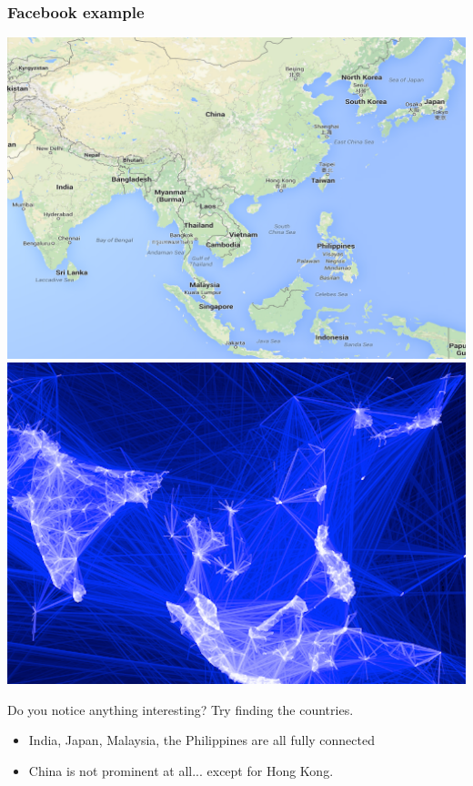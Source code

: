 \documentclass{beamer} %
\newcommand{\1}{\mathbb{1}}
\begin{document}
\begin{frame}[t]\frametitle{Facebook example}
\begin{center}
		\includegraphics[scale = 0.22]{./visualization/SEAsia_map.png}
		\includegraphics[scale = 0.22]{./visualization/SEAsia_fb.png}
	\end{center}
	Do you notice anything interesting? Try finding the countries.
	\pause
	\begin{itemize}
		\item India, Japan, Malaysia, the Philippines are all fully connected
		\item China is not prominent at all... \pause except for Hong Kong.
	\end{itemize}
\end{frame}
\end{document}
